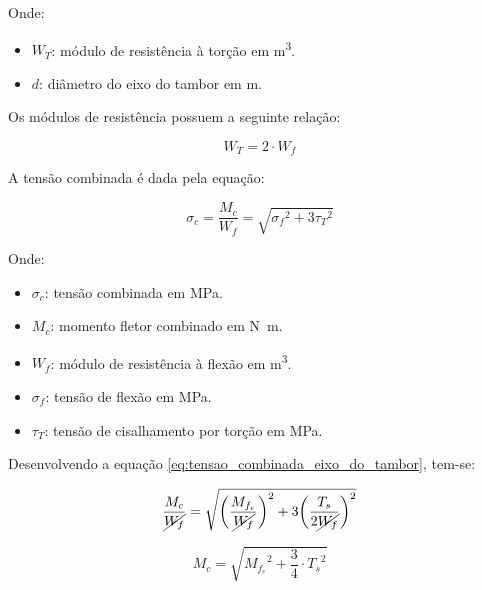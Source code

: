 Onde:

\begin{itemize}
  \item $W_T$: módulo de resistência à torção em \si{\meter^3}.
  \item $d$: diâmetro do eixo do tambor em \si{\meter}.
\end{itemize}

\vspace{1em}

Os módulos de resistência possuem a seguinte relação:

\begin{equation}
  W_T = 2 \cdot W_f
  \label{eq:relacao_modulos_eixo}
\end{equation}

A tensão combinada é dada pela equação:

\begin{equation}
  \sigma_c = \frac{M_c}{W_f} = \sqrt{{\sigma_f}^2 + 3 {\tau_T}^2}
  \label{eq:tensao_combinada_eixo_do_tambor}
\end{equation}

Onde:

\begin{itemize}
  \item $\sigma_c$: tensão combinada em \si{\mega\pascal}.
  \item $M_c$: momento fletor combinado em \si{\newton\meter}.
  \item $W_f$: módulo de resistência à flexão em \si{\meter^3}.
  \item $\sigma_f$: tensão de flexão em \si{\mega\pascal}.
  \item $\tau_T$: tensão de cisalhamento por torção em \si{\mega\pascal}.
\end{itemize}

\vspace{1em}

Desenvolvendo a equação \eqref{eq:tensao_combinada_eixo_do_tambor}, tem-se:

\begin{equation*}
  \frac{M_c}{\cancel{W_f}} = \sqrt{{\left(\frac{M_{f_e}}{\cancel{W_f}}\right)}^2 + 3 {\left(\frac{T_s}{2 \cancel{W_f}}\right)}^2}
\end{equation*}

\begin{equation}
  M_c = \sqrt{{M_{f_e}}^2 + \frac{3}{4} \cdot {T_s}^2}
  \label{eq:momento_fletor_combinado_eixo_do_tambor}
\end{equation}

